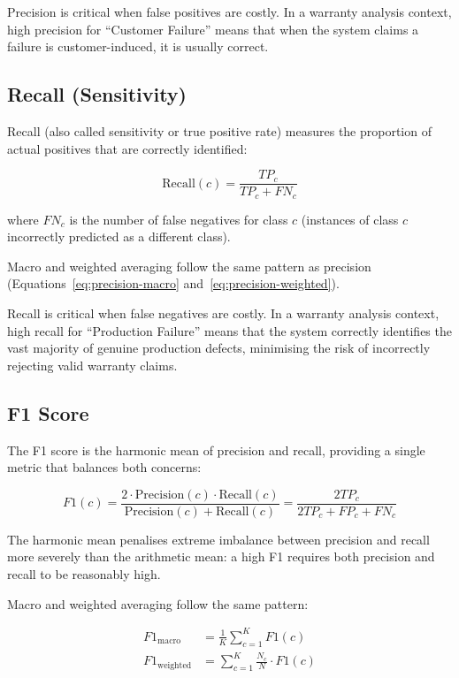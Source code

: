 \documentclass[10pt,a4paper]{article}
\begin{document}
Precision is critical when false positives are costly. In a warranty analysis context, high precision for ``Customer Failure'' means that when the system claims a failure is customer-induced, it is usually correct.

\subsection{Recall (Sensitivity)}
\label{sec:recall}

Recall (also called sensitivity or true positive rate) measures the proportion of actual positives that are correctly identified:

\begin{equation}
\text{Recall}(c) = \frac{TP_c}{TP_c + FN_c}
\label{eq:recall}
\end{equation}

where $FN_c$ is the number of false negatives for class $c$ (instances of class $c$ incorrectly predicted as a different class).

Macro and weighted averaging follow the same pattern as precision (Equations~\ref{eq:precision-macro} and~\ref{eq:precision-weighted}).

Recall is critical when false negatives are costly. In a warranty analysis context, high recall for ``Production Failure'' means that the system correctly identifies the vast majority of genuine production defects, minimising the risk of incorrectly rejecting valid warranty claims.

\subsection{F1 Score}
\label{sec:f1-score}

The F1 score is the harmonic mean of precision and recall, providing a single metric that balances both concerns:

\begin{equation}
F1(c) = \frac{2 \cdot \text{Precision}(c) \cdot \text{Recall}(c)}{\text{Precision}(c) + \text{Recall}(c)} = \frac{2TP_c}{2TP_c + FP_c + FN_c}
\label{eq:f1}
\end{equation}

The harmonic mean penalises extreme imbalance between precision and recall more severely than the arithmetic mean: a high F1 requires both precision and recall to be reasonably high.

Macro and weighted averaging follow the same pattern:

\begin{align}
F1_{\text{macro}} &= \frac{1}{K} \sum_{c=1}^{K} F1(c) \label{eq:f1-macro} \\
F1_{\text{weighted}} &= \sum_{c=1}^{K} \frac{N_c}{N} \cdot F1(c) \label{eq:f1-weighted}
\end{align}
\end{document}
